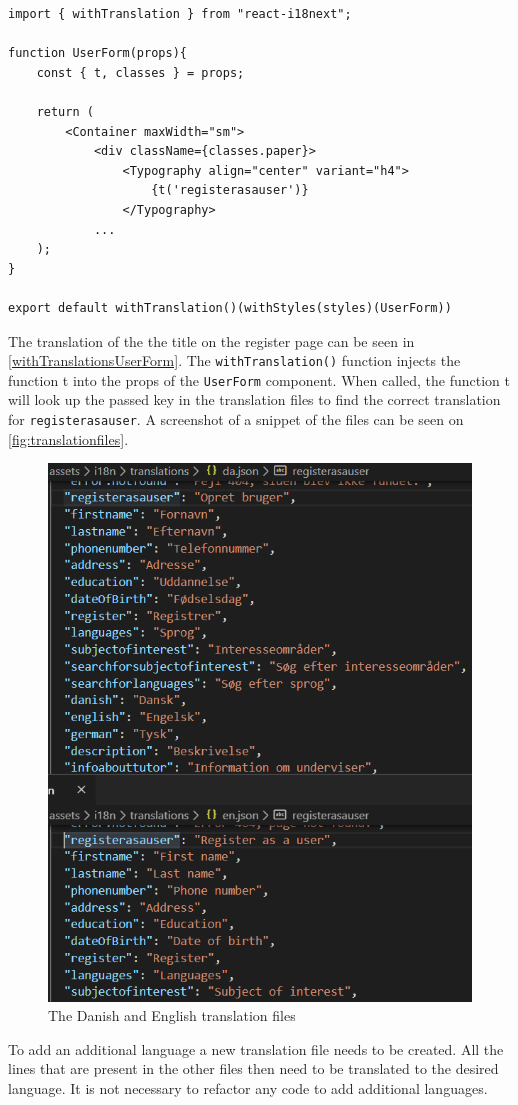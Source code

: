 \begin{lstlisting}[caption={Translated header when registering as a user.}, captionpos=b, label={withTranslationsUserForm}]
import { withTranslation } from "react-i18next";

function UserForm(props){
    const { t, classes } = props;

    return (
        <Container maxWidth="sm">
            <div className={classes.paper}>
                <Typography align="center" variant="h4">
                    {t('registerasauser')}
                </Typography>
            ...
    );
}

export default withTranslation()(withStyles(styles)(UserForm))
\end{lstlisting}
\noindent
The translation of the the title on the register page can be seen in \autoref{withTranslationsUserForm}.
The \texttt{withTranslation()} function injects the function t into the props of the \texttt{UserForm} component.
When called, the function t will look up the passed key in the translation files to find the correct translation for \texttt{registerasauser}. 
A screenshot of a snippet of the files can be seen on \autoref{fig:translationfiles}.
\begin{figure}
    \centering
    \includegraphics[scale=0.5]{figures/translationexample.PNG}
    \caption{The Danish and English translation files}
    \label{fig:translationfiles}
\end{figure}
\noindent
To add an additional language a new translation file needs to be created.
All the lines that are present in the other files then need to be translated to the desired language. 
It is not necessary to refactor any code to add additional languages.
